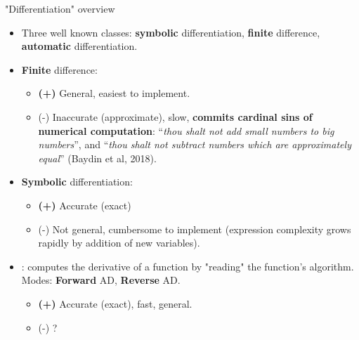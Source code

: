 \documentclass{beamer}
\begin{document}
\begin{frame}{"Differentiation" overview}
    \fontsize{8.5}{6}\selectfont
    \begin{itemize}\fontsize{8.5}{6}\selectfont
        \item Three well known classes: \textbf{symbolic} differentiation, \textbf{finite} difference, {\color{red} \textbf{automatic} differentiation}.
        \item \textbf{Finite} difference:
        \begin{itemize}\fontsize{8.5}{6}\selectfont
            \item \textbf{(+)} General, easiest to implement.
            \item (-) Inaccurate (approximate), slow, \textbf{commits cardinal sins of numerical computation}: “\textit{thou shalt not add small numbers to big numbers}”, and “\textit{thou shalt not subtract numbers which are approximately equal}” (Baydin et al, 2018).
        \end{itemize}
        \item \textbf{Symbolic} differentiation:
        \begin{itemize}
        \fontsize{8.5}{6}\selectfont
            \item \textbf{(+)} Accurate (exact)
            \item (-) Not general, cumbersome to implement (expression complexity grows rapidly by addition of new variables).
        \end{itemize}
        \item \fontsize{8.5}{6}: computes the derivative of a function by "reading" the function's algorithm. Modes: \textbf{Forward} AD, \textbf{Reverse} AD.
        \begin{itemize}
        \fontsize{8.5}{6}\selectfont
            \item \textbf{(+)} Accurate (exact), fast, general.
            \item (-) ?
        \end{itemize}
    \end{itemize}
\end{frame}
\end{document}
